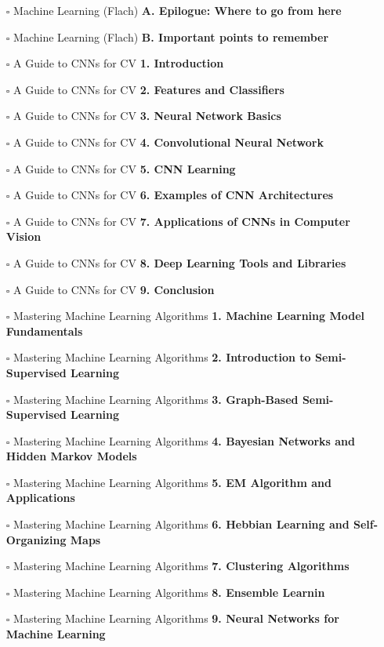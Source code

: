 \documentclass[a4, landscape, 12pt]{article}
\newcommand{\checkbox}{$\square$}%
\begin{document}
\begin{itemize}
{}
\item [\checkbox]  Machine Learning (Flach) \textbf{ A. Epilogue: Where to go from here
}
\item [\checkbox]  Machine Learning (Flach) \textbf{ B. Important points to remember
}
\item [\checkbox]  A Guide to CNNs for CV \textbf{ 1. Introduction
}
\item [\checkbox]  A Guide to CNNs for CV \textbf{ 2. Features and Classifiers
}
\item [\checkbox]  A Guide to CNNs for CV \textbf{ 3. Neural Network Basics
}
\item [\checkbox]  A Guide to CNNs for CV \textbf{ 4. Convolutional Neural Network
}
\item [\checkbox]  A Guide to CNNs for CV \textbf{ 5. CNN Learning
}
\item [\checkbox]  A Guide to CNNs for CV \textbf{ 6. Examples of CNN Architectures
}
\item [\checkbox]  A Guide to CNNs for CV \textbf{ 7. Applications of CNNs in Computer Vision
}
\item [\checkbox]  A Guide to CNNs for CV \textbf{ 8. Deep Learning Tools and Libraries
}
\item [\checkbox]  A Guide to CNNs for CV \textbf{ 9. Conclusion
}
\item [\checkbox]  Mastering Machine Learning Algorithms \textbf{ 1. Machine Learning Model Fundamentals
}
\item [\checkbox]  Mastering Machine Learning Algorithms \textbf{ 2. Introduction to Semi-Supervised Learning
}
\item [\checkbox]  Mastering Machine Learning Algorithms \textbf{ 3. Graph-Based Semi-Supervised Learning
}
\item [\checkbox]  Mastering Machine Learning Algorithms \textbf{ 4. Bayesian Networks and Hidden Markov Models
}
\item [\checkbox]  Mastering Machine Learning Algorithms \textbf{ 5. EM Algorithm and Applications
}
\item [\checkbox]  Mastering Machine Learning Algorithms \textbf{ 6. Hebbian Learning and Self-Organizing Maps
}
\item [\checkbox]  Mastering Machine Learning Algorithms \textbf{ 7. Clustering Algorithms
}
\item [\checkbox]  Mastering Machine Learning Algorithms \textbf{ 8. Ensemble Learnin
}
\item [\checkbox]  Mastering Machine Learning Algorithms \textbf{ 9. Neural Networks for Machine Learning
}
\end{itemize}
\end{document}
